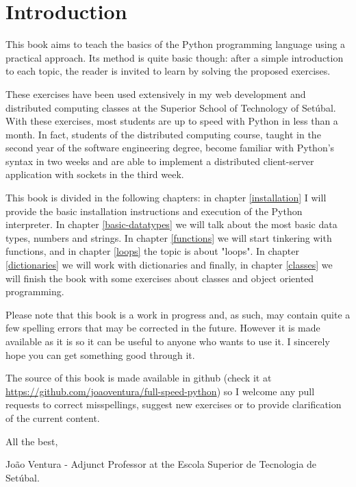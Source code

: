 \chapter{Introduction}\label{introduction}

This book aims to teach the basics of the Python programming language using a practical approach. Its method is quite basic though: after a simple introduction to each topic, the reader is invited to learn by solving the proposed exercises.

These exercises have been used extensively in my web development and distributed computing classes at the Superior School of Technology of Setúbal. With these exercises, most students are up to speed with Python in less than a month. In fact, students of the distributed computing course, taught in the second year of the software engineering degree, become familiar with Python's syntax in two weeks and are able to implement a distributed client-server application with sockets in the third week.

This book is divided in the following chapters: in chapter \ref{installation} I will provide the basic installation instructions and execution of the Python interpreter. In chapter \ref{basic-datatypes} we will talk about the most basic data types, numbers and strings. In chapter \ref{functions} we will start tinkering with functions, and in chapter \ref{loops} the topic is about "loops". In chapter \ref{dictionaries} we will work with dictionaries and finally, in chapter \ref{classes} we will finish the book with some exercises about classes and object oriented programming.

Please note that this book is a work in progress and, as such, may contain quite a few spelling errors that may be corrected in the future. However it is made available as it is so it can be useful to anyone who wants to use it. I sincerely hope you can get something good through it.

The source of this book is made available in github (check it at \url{https://github.com/joaoventura/full-speed-python}) so I welcome any pull requests to correct misspellings, suggest new exercises or to provide clarification of the current content.

All the best,

João Ventura - Adjunct Professor at the Escola Superior de Tecnologia de Setúbal.
